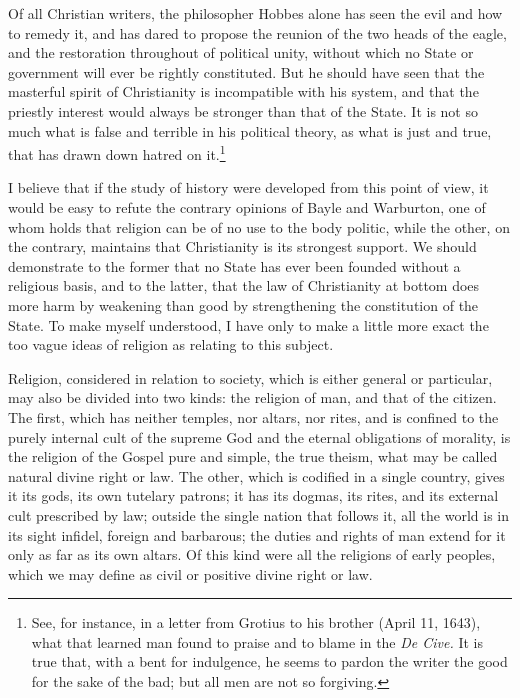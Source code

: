 \documentclass[12pt]{report}
\begin{document}
Of all Christian writers, the philosopher Hobbes alone has seen the evil and how to remedy it, and has dared to propose the reunion of the two heads of the eagle, and the restoration throughout of political unity, without which no State or government will ever be rightly constituted. But he should have seen that the masterful spirit of Christianity is incompatible with his system, and that the priestly interest would always be stronger than that of the State. It is not so much what is false and terrible in his political theory, as what is just and true, that has drawn down hatred on it.\footnote{See, for instance, in a letter from Grotius to his brother (April 11, 1643), what that learned man found to praise and to blame in the \textit{De Cive.} It is true that, with a bent for indulgence, he seems to pardon the writer the good for the sake of the bad; but all men are not so forgiving.}

I believe that if the study of history were developed from this point of view, it would be easy to refute the contrary opinions of Bayle and Warburton, one of whom holds that religion can be of no use to the body politic, while the other, on the contrary, maintains that Christianity is its strongest support. We should demonstrate to the former that no State has ever been founded without a religious basis, and to the latter, that the law of Christianity at bottom does more harm by weakening than good by strengthening the constitution of the State. To make myself understood, I have only to make a little more exact the too vague ideas of religion as relating to this subject.

Religion, considered in relation to society, which is either general or particular, may also be divided into two kinds: the religion of man, and that of the citizen. The first, which has neither temples, nor altars, nor rites, and is confined to the purely internal cult of the supreme God and the eternal obligations of morality, is the religion of the Gospel pure and simple, the true theism, what may be called natural divine right or law. The other, which is codified in a single country, gives it its gods, its own tutelary patrons; it has its dogmas, its rites, and its external cult prescribed by law; outside the single nation that follows it, all the world is in its sight infidel, foreign and barbarous; the duties and rights of man extend for it only as far as its own altars. Of this kind were all the religions of early peoples, which we may define as civil or positive divine right or law.
\end{document}
